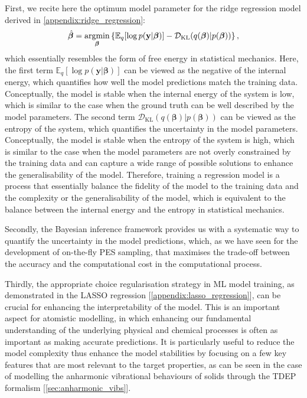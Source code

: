 First, we recite here the optimum model parameter for the ridge regression model derived in \cref{appendix:ridge_regression}:
\begin{equation}
    \label{eq:ridge_regression_optimum_parameter_bayesian_inference}
    \hat{\boldsymbol{\beta}}=\operatorname*{argmin}_{\boldsymbol{\beta}}\left\{\mathbb{E}_{q}[\log p(\mathbf{y}|\boldsymbol{\beta})]-\mathcal{D}_{\mathrm{KL}}(q(\boldsymbol{\beta})|p(\boldsymbol{\beta}))\right\},
\end{equation}  
which essentially resembles the form of free energy in statistical mechanics. Here, the first term $\mathbb{E}_{q}[\log p(\bm{y}|\boldsymbol{\beta})]$ can be viewed as the negative of the internal energy, which quantifies how well the model predictions match the training data. Conceptually, the model is stable when the internal energy of the system is low, which is similar to the case when the ground truth can be well described by the model parameters. The second term $\mathcal{D}_{\mathrm{KL}}(q(\boldsymbol{\beta})|p(\boldsymbol{\beta}))$ can be viewed as the entropy of the system, which quantifies the uncertainty in the model parameters. Conceptually, the model is stable when the entropy of the system is high, which is similar to the case when the model parameters are not overly constrained by the training data and can capture a wide range of possible solutions to enhance the generalisability of the model. Therefore, training a regression model is a process that essentially balance the fidelity of the model to the training data and the complexity or the generalisability of the model, which is equivalent to the balance between the internal energy and the entropy in statistical mechanics.

Secondly, the Bayesian inference framework provides us with a systematic way to quantify the uncertainty in the model predictions, which, as we have seen for the development of on-the-fly PES sampling,\cite{jinnouchi2019phase} that maximises the trade-off between the accuracy and the computational cost in the computational process. 

Thirdly, the appropriate choice regularisation strategy in ML model training, as demonstrated in the LASSO regression [\cref{appendix:lasso_regression}], can be crucial for enhancing the interpretability of the model. This is an important aspect for atomistic modelling, in which enhancing our fundamental understanding of the underlying physical and chemical processes is often as important as making accurate predictions. It is particularly useful to reduce the model complexity thus enhance the model stabilities by focusing on a few key features that are most relevant to the target properties, as can be seen in the case of modelling the anharmonic vibrational behaviours of solids through the TDEP formalism\cite{hellman2013temperature} [\cref{sec:anharmonic_vibs}].

